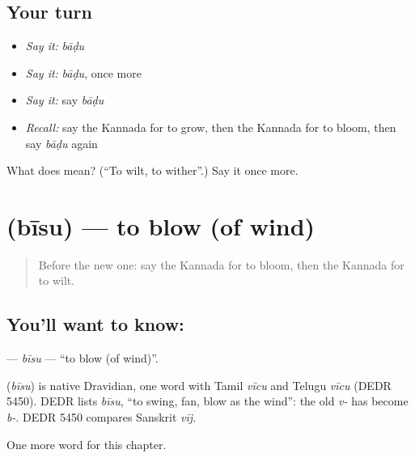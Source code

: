 \subsection*{Your turn}
\begin{itemize}
\raggedright
  \item \emph{Say it:} \emph{bāḍu}
  \item \emph{Say it:} \emph{bāḍu}, once more
  \item \emph{Say it:} say \emph{bāḍu}
  \item \emph{Recall:} say the Kannada for to grow, then the Kannada for to bloom, then say \emph{bāḍu} again
\end{itemize}

\begin{tcolorbox}[breakable,colback=teal!4,colframe=teal!35!black,title={Before you move on}]
What does  mean? (\textquotedblleft{}To wilt, to wither\textquotedblright{}.) Say it once more.
\end{tcolorbox}
\section[\texorpdfstring{\kn{ಬೀಸು} (bīsu)}{ಬೀಸು (bīsu)}]{ (bīsu) — to blow (of wind)}

\label{lesson:KA-C203-bisu}



\begin{quote}
Before the new one: say the Kannada for to bloom, then the Kannada for to wilt.
\end{quote}

\subsection*{You'll want to know: }
\textbf{} — \emph{bīsu} — \textquotedblleft{}to blow (of wind)\textquotedblright{}.

\begin{cousinweb}
\textbf{} (\emph{bīsu}) is native Dravidian, one word with Tamil \emph{vīcu} and Telugu \emph{vīcu} (DEDR 5450). DEDR lists \emph{bīsu}, \textquotedblleft{}to swing, fan, blow as the wind\textquotedblright{}: the old \emph{v-} has become \emph{b-}. DEDR 5450 compares Sanskrit \emph{vīj}.
\end{cousinweb}

\begin{grammarlens}[title={What you've built}]
One more word for this chapter.
\end{grammarlens}

